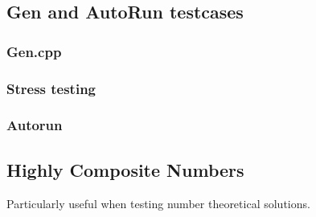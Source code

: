 \subsection{Gen and AutoRun testcases}
\subsubsection{Gen.cpp}
\subsubsection{Stress testing}
%
\subsubsection{Autorun}
%
\subsection{Highly Composite Numbers}
Particularly useful when testing number theoretical solutions.
%




